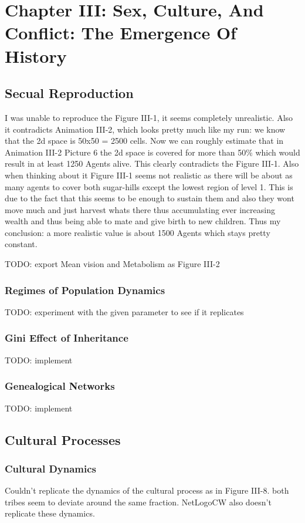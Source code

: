 \section{Chapter III: Sex, Culture, And Conflict: The Emergence Of History}

\subsection{Secual Reproduction}
I was unable to reproduce the Figure III-1, it seems completely unrealistic. Also it contradicts Animation III-2, which looks pretty much like my run: we know that the 2d space is 50x50 = 2500 cells. Now we can roughly estimate that in Animation III-2 Picture 6 the 2d space is covered for more than 50\% which would result in at least 1250 Agents alive. This clearly contradicts the Figure III-1. Also when thinking about it Figure III-1 seems not realistic as there will be about as many agents to cover both sugar-hills except the lowest region of level 1. This is due to the fact that this seems to be enough to sustain them and also they wont move much and just harvest whats there thus accumulating ever increasing wealth and thus being able to mate and give birth to new children. Thus my conclusion: a more realistic value is about 1500 Agents which stays pretty constant.

TODO: export Mean vision and Metabolism as Figure III-2

\subsubsection{Regimes of Population Dynamics}
TODO: experiment with the given parameter to see if it replicates

\subsubsection{Gini Effect of Inheritance}
TODO: implement

\subsubsection{Genealogical Networks}
TODO: implement

\subsection{Cultural Processes}
\subsubsection{Cultural Dynamics}
Couldn't replicate the dynamics of the cultural process as in Figure III-8. both tribes seem to deviate around the same fraction. NetLogoCW also doesn't replicate these dynamics.

